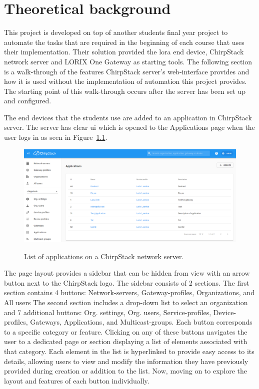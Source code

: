 
\chapter{Theoretical background} \label{ch:theor_backgr}

This project is developed on top of another students final year project \cite{theseus:gere-zoltan} to automate the tasks that are required in the beginning of each course that uses their implementation.
Their solution provided the \gls{lora} end device, ChirpStack network server and LORIX One Gateway as starting tools.
The following section is a walk-through of the features ChirpStack server's web-interface provides and how it is used without the implementation of automation this project provides.
The starting point of this walk-through occurs after the server has been set up and configured.

The end devices that the students use are added to an application in ChirpStack server.
The server has clear \gls{ui} which is opened to the Applications page when the user logs in as seen in Figure~\ref{fig:ChirpStack_application_list}.

\begin{figure}[ht]
  \centering
  {\includegraphics[width=\textwidth]{illustration/ChirpStack_application_list.png}}
  \caption{List of applications on a ChirpStack network server.}
  \label{fig:ChirpStack_application_list}
\end{figure}

The page layout provides a sidebar that can be hidden from view with an arrow button next to the ChirpStack logo.
The sidebar consists of 2 sections.
The first section contains 4 buttons: Network-servers, Gateway-profiles, Organizations, and All users
The second section includes a drop-down list to select an organization and 7 additional buttons: Org. settings, Org. users, Service-profiles, Device-profiles, Gateways, Applications, and Multicast-groups.
Each button corresponds to a specific category or feature.
Clicking on any of these buttons navigates the user to a dedicated page or section displaying a list of elements associated with that category.
Each element in the list is hyperlinked to provide easy access to its details, allowing users to view and modify the information they have previously provided during creation or addition to the list.
Now, moving on to explore the layout and features of each button individually.

